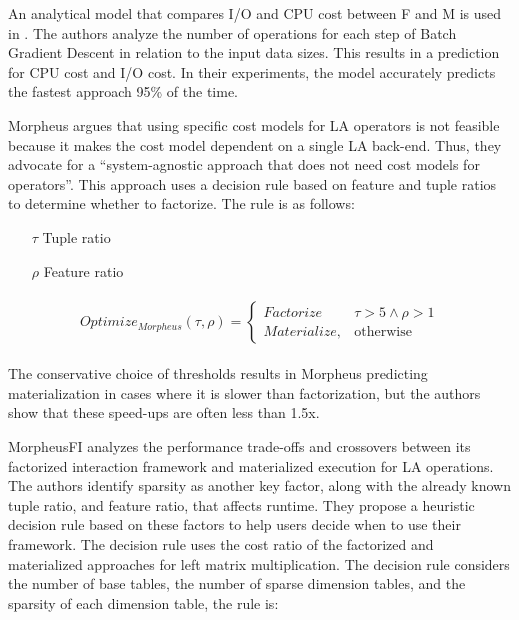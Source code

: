 An analytical model that compares I/O and CPU cost between F and M is used in \cite{orion_learning_gen_lin_models}. The authors analyze the number of operations for each step of Batch Gradient Descent in relation to the input data sizes. This results in a prediction for CPU cost and I/O cost. In their experiments, the model accurately predicts the fastest approach 95\% of the time.


Morpheus \cite{morpheus} argues that using specific cost models for LA operators is not feasible because it makes the cost model dependent on a single LA back-end. Thus, they advocate for a “system-agnostic approach that does not need cost models for operators”. This approach uses a decision rule based on feature and tuple ratios to determine whether to factorize. The rule is as follows:

\begin{definition}
	\begin{itemize}
		\item[]
		\item[$\tau$] Tuple ratio
		\item[$\rho$] Feature ratio
	\end{itemize}

	\begin{align*}
		\begin{split}
			Optimize_{Morpheus}(\tau, \rho) =
			\begin{cases}
				Factorize    & \tau > 5 \wedge \rho > 1 \\
				Materialize, & \text{otherwise}
			\end{cases}
		\end{split}
	\end{align*}
\end{definition}

The conservative choice of thresholds results in Morpheus predicting materialization in cases where it is slower than factorization, but the authors show that these speed-ups are often less than 1.5x.

MorpheusFI \cite{MorpheusFIEnablingOptimizingNonlinear2019} analyzes the performance trade-offs and crossovers between its factorized interaction framework and materialized execution for LA operations. The authors identify sparsity as another key factor, along with the already known tuple ratio, and feature ratio, that affects runtime. They propose a heuristic decision rule based on these factors to help users decide when to use their framework. The decision rule uses the cost ratio of the factorized and materialized approaches for left matrix multiplication. The decision rule considers the number of base tables, the number of sparse dimension tables, and the sparsity of each dimension table, the rule is:

